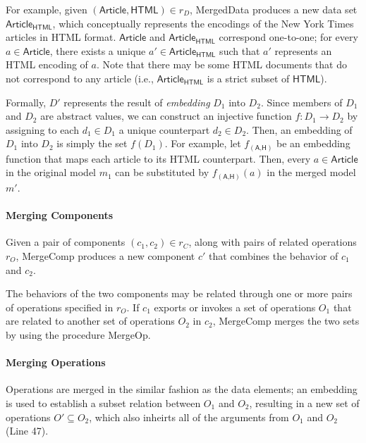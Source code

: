 For example, given $(\textsf{Article}, \textsf{HTML}) \in r_{D}$,
\textsf{MergedData} produces a new data set
$\textsf{Article}_{\textsf{HTML}}$, which conceptually represents the
encodings of the New York Times articles in HTML
format. $\textsf{Article}$ and $\textsf{Article}_{\textsf{HTML}}$
correspond one-to-one; for every $a \in \textsf{Article}$, there
exists a unique $a' \in \textsf{Article}_{\textsf{HTML}}$ such that
$a'$ represents an HTML encoding of $a$. Note that there may be some
HTML documents that do not correspond to any article (i.e.,
$\textsf{Article}_{\textsf{HTML}}$ is a strict subset of
$\textsf{HTML}$).

Formally, $D'$ represents the result of \textit{embedding} $D_{1}$ into
$D_{2}$. Since members of $D_{1}$ and $D_{2}$ are abstract values, we can
construct an injective function $f : D_{1} \rightarrow D_{2}$ by assigning
to each $d_{1} \in D_{1}$ a unique counterpart $d_{2} \in D_{2}$. Then, an
embedding of $D_{1}$ into $D_{2}$ is simply the set $f(D_{1})$. For example,
let $f_{(\textsf{A,H})}$ be an embedding function that maps each
article to its HTML counterpart. Then, every $a \in \textsf{Article}$
in the original model $m_{1}$ can be substituted by
$f_{(\textsf{A,H})}(a)$ in the merged model $m'$.


\paragraph{\textbf{Merging Components}} Given a pair of components
$(c_{1}, c_{2}) \in r_{C}$, along with pairs of related operations $r_{O}$,
\textsf{MergeComp} produces a new component $c'$ that combines the
behavior of $c_{1}$ and $c_{2}$.

The behaviors of the two components may be related through one or more
pairs of operations specified in $r_{O}$. If $c_{1}$ exports or invokes
a set of operations $O_{1}$ that are related to another set of operations
$O_{2}$ in $c_{2}$, \textsf{MergeComp} merges the two sets by using the
procedure \textsf{MergeOp}. 

\paragraph{\textbf{Merging Operations}} Operations are merged in the
similar fashion as the data elements; an embedding is used to
establish a subset relation between $O_{1}$ and $O_{2}$, resulting in a new
set of operations $O' \subseteq O_{2}$, which also inheirts all of the
arguments from $O_{1}$ and $O_{2}$ (Line 47).

